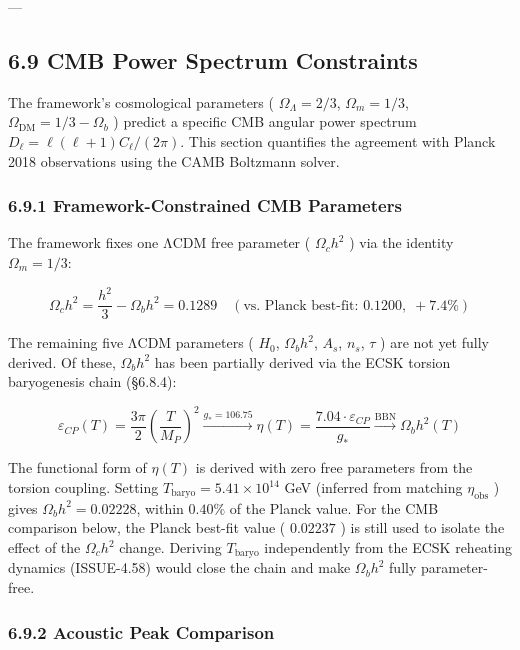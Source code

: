 \documentclass[11pt,a4paper]{article}
\theoremstyle{definition}
\theoremstyle{remark}
\begin{document}
---

\subsection{6.9 CMB Power Spectrum Constraints}

The framework's cosmological parameters ( $\Omega_\Lambda = 2/3$, $\Omega_m = 1/3$, $\Omega_{\text{DM}} = 1/3 - \Omega_b$ ) predict a specific CMB angular power spectrum $D_\ell = \ell(\ell+1)C_\ell / (2\pi)$. This section quantifies the agreement with Planck 2018 observations using the CAMB Boltzmann solver.

\subsubsection{6.9.1 Framework-Constrained CMB Parameters}

The framework fixes one ΛCDM free parameter ( $\Omega_c h^2$ ) via the identity $\Omega_m = 1/3$:


\begin{equation}
\Omega_c h^2 = \frac{h^2}{3} - \Omega_b h^2 = 0.1289 \quad (\text{vs. Planck best-fit: } 0.1200, \; +7.4\%)
\end{equation}


The remaining five ΛCDM parameters ( $H_0$, $\Omega_b h^2$, $A_s$, $n_s$, $\tau$ ) are not yet fully derived. Of these, $\Omega_b h^2$ has been partially derived via the ECSK torsion baryogenesis chain (\S 6.8.4):


\begin{equation}
\varepsilon_{CP}(T) = \frac{3\pi}{2}\left(\frac{T}{M_P}\right)^2 \xrightarrow{g_* = 106.75} \eta(T) = \frac{7.04 \cdot \varepsilon_{CP}}{g_*} \xrightarrow{\text{BBN}} \Omega_b h^2(T)
\end{equation}


The functional form of $\eta(T)$ is derived with zero free parameters from the torsion coupling. Setting $T_{\text{baryo}} = 5.41 \times 10^{14}$ GeV (inferred from matching $\eta_{\text{obs}}$ ) gives $\Omega_b h^2 = 0.02228$, within $0.40\%$ of the Planck value. For the CMB comparison below, the Planck best-fit value ( $0.02237$ ) is still used to isolate the effect of the $\Omega_c h^2$ change. Deriving $T_{\text{baryo}}$ independently from the ECSK reheating dynamics (ISSUE-4.58) would close the chain and make $\Omega_b h^2$ fully parameter-free.

\subsubsection{6.9.2 Acoustic Peak Comparison}
\end{document}
